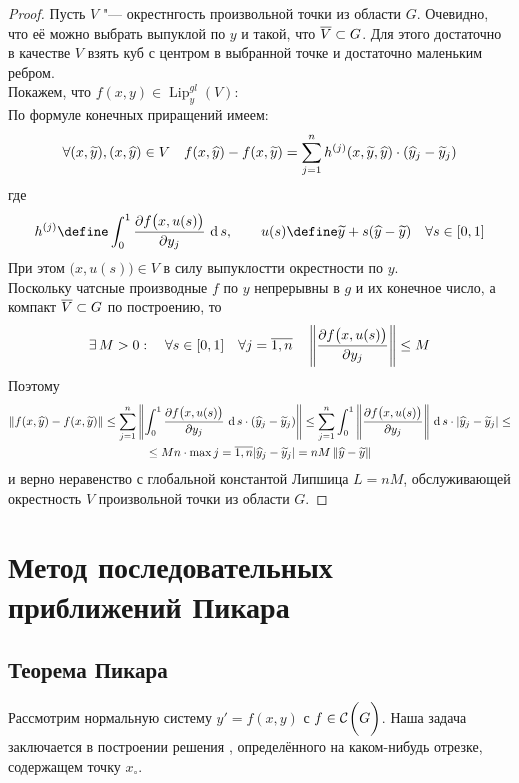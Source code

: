 \begin{proof}
	Пусть $ V $ "--- окрестнгость произвольной точки из области $ G $. Очевидно, что её можно выбрать выпуклой по $ y $ и такой, что $ \ol V \sub G $. Для этого достаточно в качестве $ V $ взять куб с центром в выбранной точке и достаточно маленьким ребром. \\
    Покажем, что $ f(x, y) \in \operatorname{Lip}_y^{gl}(V) $: \\
    По формуле конечных приращений имеем:
    $$ \forall (x, \vawe y), (x, \hat y) \in V \quad f(x, \hat y) - f(x, \vawe y) = \sum_{j = 1}^nh^{(j)}(x, \vawe y, \hat y) \cdot (\hat{y}_j - \vawe{y}_j) $$
    где
    $$ h^{(j)} \define \dint[s]01{\pder{f \big( x, u(s) \big)}{y_j}}, \qquad u(s) \define \vawe y + s(\hat y - \vawe y) \quad \forall s \in [0, 1] $$
    При этом $ \big( x, u(s) \big) \in V $ в силу выпуклостти окрестности по $ y $. \\
    Поскольку чатсные производные $ f $ по $ y $ непрерывны в $ g $ и их конечное число, а компакт $ \ol V \sub G $ по построению, то
    $$ \exist M > 0 : \quad \forall s \in [0, 1] \quad \forall j = \ol{1, n} \quad \norm{\pder{f \big( x, u(s) \big)}{y_j}} \le M $$
    Поэтому
    \begin{multline*}
        \norm{f(x, \hat y) - f(x, \vawe y)} \le \sum_{j = 1}^n \norm{ \dint[s]01{\pder{f \big( x, u(s) \big)}{y_j}} \cdot (\hat{y}_j - \vawe{y}_j)} \le \sum_{j = 1}^n \dint[s]01{\norm{ \pder{f \big( x, u(s) \big)}{y_j}}} \cdot |\hat{y}_j - \vawe{y}_j| \le \\
        \le Mn \cdot \max\limits{j = \ol{1, n}}|\hat{y}_j - \vawe{y}_j| = nM\norm{\hat y - \vawe y}
    \end{multline*}
    и верно неравенство  с глобальной константой Липшица $ L = nM $, обслуживающей окрестность $ V $ произвольной точки из области $ G $.
\end{proof}

\section{Метод последовательных приближений Пикара}

\subsection{Теорема Пикара}

Рассмотрим нормальную систему $ y' = f(x, y) $ с $ f \in \Cont G $. Наша задача заключается в построении решения , определённого на каком-нибудь отрезке, содержащем точку $ x_\circ $.


